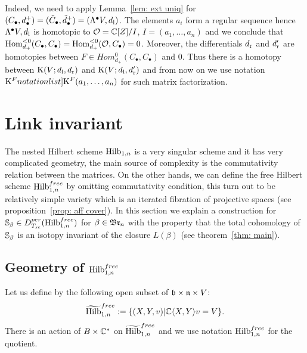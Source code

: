 \documentclass[10pt]{amsart}
\begin{document}
Indeed, we need to apply Lemma~\ref{lem: ext uniq} for \((C_\bullet,d^+_\bullet)=(\tilde{C}_\bullet,\tilde{d}_\bullet^+)=(\Lambda^\bullet V,d_{\mathrm{l}})\).
The elements \(a_i\) form a regular sequence hence \(\Lambda^\bullet V,d_{\mathrm{l}}\) is homotopic to \(\mathcal{O}=\mathbb{C}[Z]/I\), \(I=(a_1,\dots,a_n)\) and
we conclude that \(\mathop{{\rm Hom}}\nolimits_{d_+}^{<0}(C_\bullet,C_\bullet)=\mathop{{\rm Hom}}\nolimits_{d_+}^{<0}(\mathcal{O},C_\bullet)=0\). Moreover, the differentials \(d_{\mathrm{r}}\) and \(d_{\mathrm{r}}'\)
are homotopies between \(F\in Hom_{d_+}^0(C_\bullet,C_\bullet)\) and \(0\).
Thus there is a homotopy between $\mathrm{K}(V;d_{\mathrm{l}},d_{\mathrm{r}})$ and $\mathrm{K}(V;d_{\mathrm{l}},d_{\mathrm{r}}')$ and  from now on we use notation $\SymbolPrint{\mathrm{K}^F}(a_1,\dots,a_n)$ for such matrix factorization.









%





















\section{Link invariant}\label{sec: link inv 2}
The nested Hilbert scheme $\mathrm{Hilb}_{1,n}$ is a very singular scheme and it has very complicated geometry, the main source of complexity is the commutativity relation between the matrices.
On the other hands, we can define  the free Hilbert scheme $\mathrm{Hilb}^{free}_{1,n}$ by omitting commutativity condition, this turn out to be relatively simple variety which is an iterated fibration of
projective spaces (see proposition~\ref{prop: aff cover}). In this section we explain a construction for $\mathbb{S}_\beta \in D^{per}_{T_{sc}}(\mathrm{Hilb}^{free}_{1,n})$ for $\beta\in \mathfrak{Br}_n$ with the property that
the total cohomology of $\mathbb{S}_\beta$ is an isotopy  invariant of the closure $L(\beta)$ (see theorem~\ref{thm: main}).


\subsection{Geometry of $\mathrm{Hilb}^{free}_{1,n}$} Let us define by the following open subset of $\mathfrak{b}\times\mathfrak{n}\times V$:
$$\widetilde{\mathrm{Hilb}}^{free}_{1,n}:=\{ (X,Y,v)| \mathbb{C}\langle X,Y\rangle v=V\}.$$
There is an action of $B\times \mathbb{C}^*$ on $\widetilde{\mathrm{Hilb}}^{free}_{1,n}$ and we use notation $\mathrm{Hilb}^{free}_{1,n}$ for the quotient.
\end{document}
